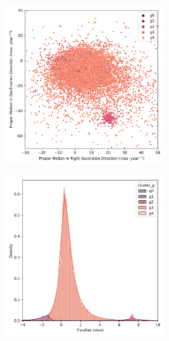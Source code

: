\documentclass[11pt,a4paper,english,twocolumn]{article}
\begin{document}
\begin{figure}[htbp]
  \centering
  \begin{subfigure}{\columnwidth}
    \centering
    \begin{subfigure}[t]{0.30\textwidth}
      \centering
      \includegraphics[width=\textwidth]{../figures/melotte_22/dec_pm_melotte_22.png}
    \end{subfigure}
    \hfill
    \begin{subfigure}[t]{0.30\textwidth}
      \centering
      \includegraphics[width=\textwidth]{../figures/melotte_22/dec_parallax_melotte_22.png}

\end{subfigure}
\end{subfigure}
\end{figure}
\end{document}
